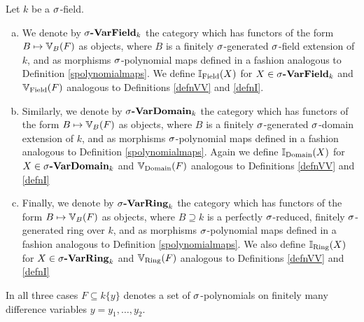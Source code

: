 \begin{defn}
Let $k$ be a $\sigma$-field. 
\begin{enumerate}[(a)]
\item We denote by $\sigma\text{{\normalfont\textbf{-VarField}}}_k$ the category which has functors of the form $B \mapsto \mathbb{V}_B(F)$ as objects, where $B$ is a finitely $\sigma$-generated $\sigma$-field extension of $k$,
 and as morphisms $\sigma$-polynomial maps defined in a fashion analogous to Definition \ref{spolynomialmaps}. We define $\mathbb{I}_{\operatorname{Field}}(X)$ for $X \in \sigma\text{{\normalfont\textbf{-VarField}}}_k$ and $\mathbb{V}_{\operatorname{Field}}(F)$ analogous to Definitions \ref{defnVV} and \ref{defnI}.
\item Similarly, we denote by $\sigma\text{{\normalfont\textbf{-VarDomain}}}_k$ the category which has functors of the form $B \mapsto \mathbb{V}_B(F)$ as objects, where $B$ is a finitely $\sigma$-generated $\sigma$-domain extension of $k$,
 and as morphisms $\sigma$-polynomial maps defined in a fashion analogous to Definition \ref{spolynomialmaps}. Again we define $\mathbb{I}_{\operatorname{Domain}}(X)$ for $X \in \sigma\text{{\normalfont\textbf{-VarDomain}}}_k$ and $\mathbb{V}_{\operatorname{Domain}}(F)$ analogous to Definitions \ref{defnVV} and \ref{defnI}
\item Finally,  we denote by $\sigma\text{{\normalfont\textbf{-VarRing}}}_k$ the category which has functors of the form $B \mapsto \mathbb{V}_B(F)$ as objects, where $B \supseteq k$ is a perfectly $\sigma$-reduced, finitely $\sigma$-generated ring over $k$,
 and as morphisms $\sigma$-polynomial maps defined in a fashion analogous to Definition \ref{spolynomialmaps}. We also define $\mathbb{I}_{\operatorname{Ring}}(X)$ for $X \in \sigma\text{{\normalfont\textbf{-VarRing}}}_k$ and $\mathbb{V}_{\operatorname{Ring}}(F)$ analogous to Definitions \ref{defnVV} and \ref{defnI}
\end{enumerate}
In all three cases $F \subseteq k\{y\}$ denotes a set of $\sigma$-polynomials on finitely many difference variables $y = y_1, \ldots, y_2$.
\end{defn}

